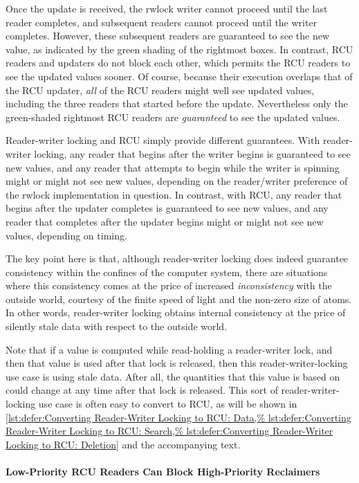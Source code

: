 Once the update is received, the rwlock writer cannot proceed until the
last reader completes, and subsequent readers cannot proceed until the
writer completes.
However, these subsequent readers are guaranteed to see the new value,
as indicated by the green shading of the rightmost boxes.
In contrast, RCU readers and updaters do not block each other, which permits
the RCU readers to see the updated values sooner.
Of course, because their execution overlaps that of the RCU updater,
\emph{all} of the RCU readers might well see updated values, including
the three readers that started before the update.
Nevertheless only the green-shaded rightmost RCU readers
are \emph{guaranteed} to see the updated values.

Reader-writer locking and RCU simply provide different guarantees.
With reader-writer locking, any reader that begins after the writer begins
is guaranteed to see new values, and any reader that attempts to
begin while the writer is spinning might or might not see new values,
depending on the reader/writer preference of the rwlock implementation in
question.
In contrast, with RCU, any reader that begins after the updater completes
is guaranteed to see new values, and any reader that completes after the
updater begins might or might not see new values, depending on timing.

The key point here is that, although reader-writer locking does
indeed guarantee consistency within the confines of the computer system,
there are situations where this consistency comes at the price of
increased \emph{inconsistency} with the outside world, courtesy of
the finite speed of light and the non-zero size of atoms.
In other words, reader-writer locking obtains internal consistency at the
price of silently stale data with respect to the outside world.

Note that if a value is computed while read-holding a reader-writer
lock, and then that value is used after that lock is released, then
this reader-writer-locking use case is using stale data.
After all, the quantities that this value is based on could change
at any time after that lock is released.
This sort of reader-writer-locking use case is often easy to
convert to RCU, as will be shown in
\cref{lst:defer:Converting Reader-Writer Locking to RCU: Data,%
lst:defer:Converting Reader-Writer Locking to RCU: Search,%
lst:defer:Converting Reader-Writer Locking to RCU: Deletion}
and the accompanying text.

\paragraph{Low-Priority RCU Readers Can Block High-Priority Reclaimers}

